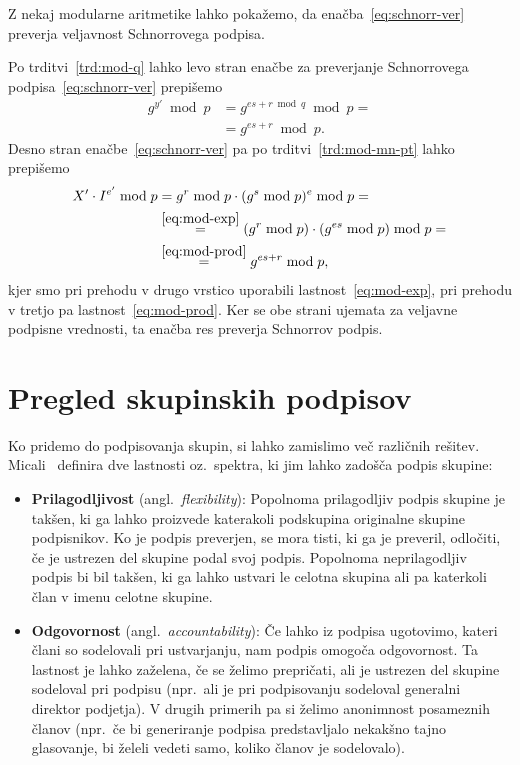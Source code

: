 \documentclass[isrm2, tisk]{fmfdelo}
\begin{document}
Z nekaj modularne aritmetike lahko pokažemo, da enačba~\eqref{eq:schnorr-ver} preverja veljavnost
Schnorrovega podpisa.

Po trditvi~\ref{trd:mod-q} lahko levo stran enačbe za preverjanje Schnorrovega podpisa~\eqref{eq:schnorr-ver}
prepišemo
\begin{align*}
    g^{y'} \bmod p &= g^{es + r \bmod q} \bmod p = \\ 
                   &= g^{es + r} \bmod p. 
\end{align*}
Desno stran enačbe~\eqref{eq:schnorr-ver} pa po trditvi~\ref{trd:mod-mn-pt} lahko prepišemo
\begin{align*}
X' \cdot I^{e'} \bmod p &= g^r \bmod p \cdot (g^s \bmod p)^e \bmod p = \\
                        &\stackrel{\eqref{eq:mod-exp}}{=} (g^r \bmod p) \cdot (g^{es} \bmod p) \bmod p = \\ 
                        &\stackrel{\eqref{eq:mod-prod}}{=} g^{es + r} \bmod p,
\end{align*}
kjer smo pri prehodu v drugo vrstico uporabili lastnost~\eqref{eq:mod-exp}, pri prehodu v tretjo 
pa lastnost~\eqref{eq:mod-prod}. Ker se obe strani ujemata za veljavne podpisne vrednosti, ta enačba 
res preverja Schnorrov podpis.

\section{Pregled skupinskih podpisov}
\label{sec:skpine}
Ko pridemo do podpisovanja skupin, si lahko zamislimo več različnih rešitev. Micali~\cite{micali2001asm} 
definira dve lastnosti oz.\ spektra, ki jim lahko zadošča podpis skupine:
\begin{itemize}
    \item \textbf{Prilagodljivost} (angl.\ \textit{flexibility}): Popolnoma prilagodljiv podpis skupine
        je takšen, ki ga lahko proizvede katerakoli podskupina originalne skupine podpisnikov. Ko je podpis 
        preverjen, se mora tisti, ki ga je preveril, odločiti, če je ustrezen del skupine podal svoj podpis. 
        Popolnoma neprilagodljiv podpis bi bil takšen, ki ga lahko ustvari le celotna skupina ali pa
        katerkoli član v imenu celotne skupine.
    \item \textbf{Odgovornost} (angl.\ \textit{accountability}): Če lahko iz podpisa ugotovimo, kateri člani 
        so sodelovali pri ustvarjanju, nam podpis omogoča odgovornost. Ta lastnost je lahko zaželena, če 
        se želimo prepričati, ali je ustrezen del skupine sodeloval pri podpisu (npr.\ ali je pri podpisovanju 
        sodeloval generalni direktor podjetja). V drugih primerih pa si želimo anonimnost posameznih članov 
        (npr.\ če bi generiranje podpisa predstavljalo nekakšno tajno glasovanje, bi želeli vedeti samo, koliko 
        članov je sodelovalo).
\end{itemize}
\end{document}
